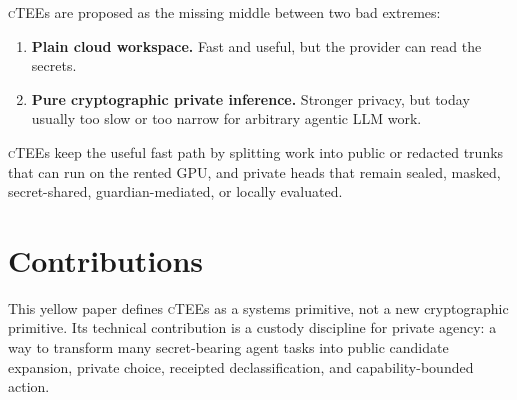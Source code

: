 \documentclass[11pt]{article}
\newcommand{\ctee}{\textnormal{\textsc{cTEE}}}
\begin{document}
\ctee{}s are proposed as the missing middle between two bad extremes:

\begin{enumerate}[leftmargin=1.5em]
\item \textbf{Plain cloud workspace.} Fast and useful, but the provider can
read the secrets.
\item \textbf{Pure cryptographic private inference.} Stronger privacy, but
today usually too slow or too narrow for arbitrary agentic LLM work.
\end{enumerate}

\ctee{}s keep the useful fast path by splitting work into public or redacted
trunks that can run on the rented GPU, and private heads that remain sealed,
masked, secret-shared, guardian-mediated, or locally evaluated.

\section{Contributions}

This yellow paper defines \ctee{}s as a systems primitive, not a new
cryptographic primitive. Its technical contribution is a custody discipline for
private agency: a way to transform many secret-bearing agent tasks into public
candidate expansion, private choice, receipted declassification, and
capability-bounded action.
\end{document}
